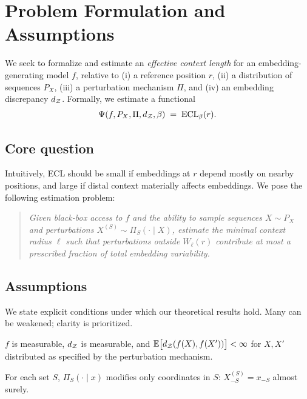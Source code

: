 \section{Problem Formulation and Assumptions}\label{sec:formulation}

We seek to formalize and estimate an \emph{effective context length} for an embedding-generating model $f$, relative to (i) a reference position $r$, (ii) a distribution of sequences $P_X$, (iii) a perturbation mechanism $\Pi$, and (iv) an embedding discrepancy $d_{\mathcal{Z}}$. Formally, we estimate a functional
\[
\Psi(f, P_X, \Pi, d_{\mathcal{Z}}, \beta) \;=\; \mathrm{ECL}_\beta(r).
\]

\subsection{Core question}

Intuitively, ECL should be small if embeddings at $r$ depend mostly on nearby positions, and large if distal context materially affects embeddings. We pose the following estimation problem:

\begin{quote}
\emph{Given black-box access to $f$ and the ability to sample sequences $X\sim P_X$ and perturbations $X^{(S)}\sim \Pi_S(\cdot\mid X)$, estimate the minimal context radius $\ell$ such that perturbations outside $W_\ell(r)$ contribute at most a prescribed fraction of total embedding variability.}
\end{quote}

\subsection{Assumptions}

We state explicit conditions under which our theoretical results hold. Many can be weakened; clarity is prioritized.

\begin{assumption}\label{ass:meas}
$f$ is measurable, $d_{\mathcal{Z}}$ is measurable, and
$\mathbb{E}\big[d_{\mathcal{Z}}(f(X),f(X'))\big] < \infty$
for $X,X'$ distributed as specified by the perturbation mechanism.
\end{assumption}

\begin{assumption}\label{ass:local}
For each set $S$, $\Pi_S(\cdot\mid x)$ modifies only coordinates in $S$: $X^{(S)}_{-S}=x_{-S}$ almost surely.
\end{assumption}

